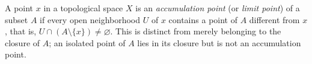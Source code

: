 
A point $x$ in a topological space $X$ is an \emph{accumulation point} (or \emph{limit point}) of a subset $A$ if every open neighborhood $U$ of $x$ contains a point of $A$ different from $x$, that is, $U\cap(A\setminus\{x\})\ne\varnothing$. This is distinct from merely belonging to the closure of $A$; an isolated point of $A$ lies in its closure but is not an accumulation point.
